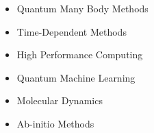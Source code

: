 

\vspace*{-0.4 cm}
\begin{multicols}{2}\raggedright %
    \begin{itemize}
        \item[\circ] Quantum Many Body Methods
        \item[\circ] Time-Dependent Methods
        \item[\circ] High Performance Computing
      \end{itemize}
  \columnbreak
  
  \begin{itemize}
    \item[\circ] Quantum Machine Learning
    \item[\circ] Molecular Dynamics
    \item[\circ] Ab-initio Methods
  \end{itemize}
  \columnbreak
  
\end{multicols}


